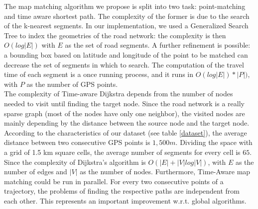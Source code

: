\documentclass[5p]{elsarticle}
\begin{document}
The map matching algorithm we propose is split into two task: point-matching and time aware shortest path. The complexity of the former is due to the search of the k-nearest segments. 
In our implementation, we used a Generalized Search Tree to index the geometries of the road network: the complexity is then $O(log |E|)$ with $E$ as the set of road segments.
A further refinement is possible: a bounding box based on latitude and longitude of the point to be matched can decrease the set of segments in which to search. The computation of the travel time of each segment is a once running process, and it runs in $O(log|E|) * |P|)$, with $P$ as the number of GPS points.\\
The complexity of Time-aware Dijkstra depends from the number of nodes needed to visit until finding the target node. Since the road network is a really sparse graph (most of the nodes have only one neighbor), 
the visited nodes are mainly depending by the distance between the source node and the target node.  According to the characteristics of our dataset (see table \ref{dataset}), the average distance between two 
consecutive GPS points is $1,500 m$. Dividing the space with a grid of 1.5 km square cells, the average number of segments for every cell is  $65$. Since the complexity of Dijkstra's algorithm
is $O(|E| + |V| log |V|)$, with $E$  as the number of edges and $|V|$ as the number of nodes.
Furthermore, Time-Aware map matching could be run in parallel. For every two consecutive points of a trajectory, the problems of finding the respective paths are independent from each other. This represents an 
important improvement w.r.t. global algorithms. 
\end{document}
